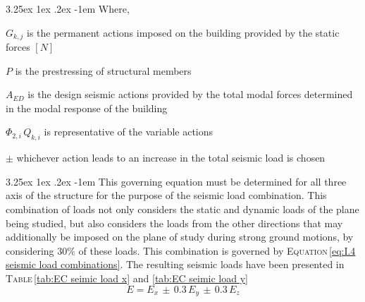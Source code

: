 \documentclass[11pt,a4paper,titlepage]{report}
\makeatletter
\renewcommand\paragraph{\@startsection{paragraph}{5}{\z@}%
  {3.25ex \@plus1ex \@minus.2ex}%
  {-1em}%
  {\normalfont\normalsize\bfseries}}
\makeatother
\begin{document}
\paragraph{}Where,
\begin{itemize}
   \begin{small}
    \item $G_{k,j}$ is the permanent actions imposed on the building provided by the static forces $[N]$
    \item $P$ is the prestressing of structural members 
    \item $A_{ED}$ is the design seismic actions provided by the total modal forces determined in the modal response of the building
    \item $\Phi_{2,i}\,Q_{k,i}$ is representative of the variable actions 
     \item $\pm$ whichever action leads to an increase in the total seismic load is chosen 
   \end{small}
\end{itemize}
\paragraph{}This governing equation must be determined for all three axis of the structure for the purpose of the seismic load combination. This combination of loads not only considers the static and dynamic loads of the plane being studied, but also considers the loads from the other directions that may additionally be imposed on the plane of study during strong ground motions, by considering $30\%$ of these loads. This combination is governed by \textsc{Equation}\,\eqref{eq:I.4 seismic load combinations}. The resulting seismic loads have been presented in \textsc{Table}\,\ref{tab:EC seimic load x} and \ref{tab:EC seimic load y}
\begin{equation}
    E=E_x\,\pm\,0.3\,E_y\,\pm\,0.3\,E_z
    \label{eq:I.4 seismic load combinations}
\end{equation}
\end{document}
